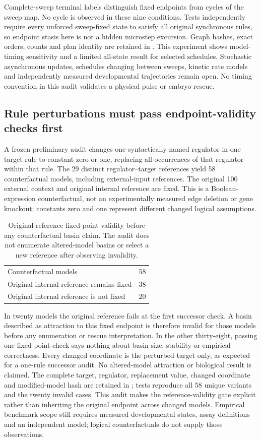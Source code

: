 Complete-sweep terminal labels distinguish fixed endpoints from cycles of the sweep map. No cycle is observed in these nine conditions. Tests independently require every unforced sweep-fixed state to satisfy all original synchronous rules, so endpoint stasis here is not a hidden microstep excursion. Graph hashes, exact orders, counts and plan identity are retained in . This experiment shows model-timing sensitivity and a limited all-state result for selected schedules. Stochastic asynchronous updates, schedules changing between sweeps, kinetic rate models and independently measured developmental trajectories remain open. No timing convention in this audit validates a physical pulse or embryo rescue.

\subsection{Rule perturbations must pass endpoint-validity checks first}
A frozen preliminary audit changes one syntactically named regulator in one target rule to constant zero or one, replacing all occurrences of that regulator within that rule. The 29 distinct regulator--target references yield 58 counterfactual models, including external-input references. The original 100 external context and original internal reference are fixed. This is a Boolean-expression counterfactual, not an experimentally measured edge deletion or gene knockout; constants zero and one represent different changed logical assumptions.
\begin{table}[ht]\centering
\caption{Original-reference fixed-point validity before any counterfactual basin claim. The audit does not enumerate altered-model basins or select a new reference after observing invalidity.}
\begin{tabular}{lr}\hline
Counterfactual models &58\\
Original internal reference remains fixed &38\\
Original internal reference is not fixed &20\\\hline
\end{tabular}\end{table}
In twenty models the original reference fails at the first successor check. A basin described as attraction to this fixed endpoint is therefore invalid for those models before any enumeration or rescue interpretation. In the other thirty-eight, passing one fixed-point check says nothing about basin size, stability or empirical correctness. Every changed coordinate is the perturbed target only, as expected for a one-rule successor audit. No altered-model attraction or biological result is claimed.
The complete target, regulator, replacement value, changed coordinate and modified-model hash are retained in ; tests reproduce all 58 unique variants and the twenty invalid cases. This audit makes the reference-validity gate explicit rather than inheriting the original endpoint across changed models. Empirical benchmark scope still requires measured developmental states, assay definitions and an independent model; logical counterfactuals do not supply those observations.
